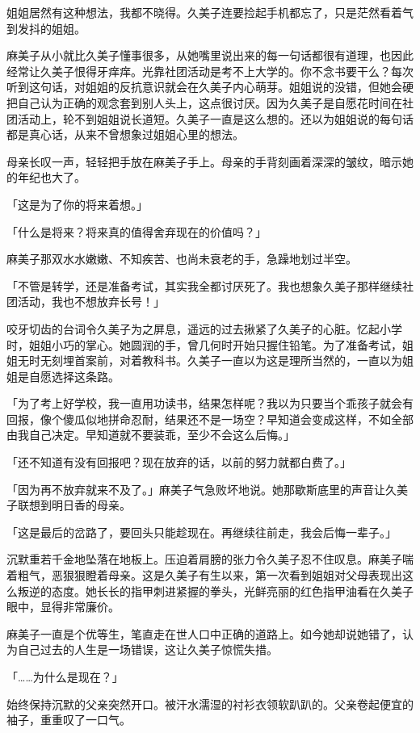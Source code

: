\documentclass[UTF8]{ctexart}
\begin{document}
    姐姐居然有这种想法，我都不晓得。久美子连要捡起手机都忘了，只是茫然看着气到发抖的姐姐。 

    麻美子从小就比久美子懂事很多，从她嘴里说出来的每一句话都很有道理，也因此经常让久美子恨得牙痒痒。光靠社团活动是考不上大学的。你不念书要干么？每次听到这句话，对姐姐的反抗意识就会在久美子内心萌芽。姐姐说的没错，但她会硬把自己认为正确的观念套到别人头上，这点很讨厌。因为久美子是自愿花时间在社团活动上，轮不到姐姐说长道短。久美子一直是这么想的。还以为姐姐说的每句话都是真心话，从来不曾想象过姐姐心里的想法。 

    母亲长叹一声，轻轻把手放在麻美子手上。母亲的手背刻画着深深的皱纹，暗示她的年纪也大了。 

    「这是为了你的将来着想。」 

    「什么是将来？将来真的值得舍弃现在的价值吗？」 

    麻美子那双水水嫩嫩、不知疾苦、也尚未衰老的手，急躁地划过半空。 

    「不管是转学，还是准备考试，其实我全都讨厌死了。我也想象久美子那样继续社团活动，我也不想放弃长号！」 

    咬牙切齿的台词令久美子为之屏息，遥远的过去揪紧了久美子的心脏。忆起小学时，姐姐小巧的掌心。她圆润的手，曾几何时开始只握住铅笔。为了准备考试，姐姐无时无刻埋首案前，对着教科书。久美子一直以为这是理所当然的，一直以为姐姐是自愿选择这条路。 

    「为了考上好学校，我一直用功读书，结果怎样呢？我以为只要当个乖孩子就会有回报，像个傻瓜似地拼命忍耐，结果还不是一场空？早知道会变成这样，不如全部由我自己决定。早知道就不要装乖，至少不会这么后悔。」 

    「还不知道有没有回报吧？现在放弃的话，以前的努力就都白费了。」 

    「因为再不放弃就来不及了。」麻美子气急败坏地说。她那歇斯底里的声音让久美子联想到明日香的母亲。 

    「这是最后的岔路了，要回头只能趁现在。再继续往前走，我会后悔一辈子。」 

    沉默重若千金地坠落在地板上。压迫着肩膀的张力令久美子忍不住叹息。麻美子喘着粗气，恶狠狠瞪着母亲。这是久美子有生以来，第一次看到姐姐对父母表现出这么叛逆的态度。她长长的指甲刺进紧握的拳头，光鲜亮丽的红色指甲油看在久美子眼中，显得非常廉价。 

    麻美子一直是个优等生，笔直走在世人口中正确的道路上。如今她却说她错了，认为自己过去的人生是一场错误，这让久美子惊慌失措。 

    「……为什么是现在？」 

    始终保持沉默的父亲突然开口。被汗水濡湿的衬衫衣领软趴趴的。父亲卷起便宜的袖子，重重叹了一口气。 
\end{document}
